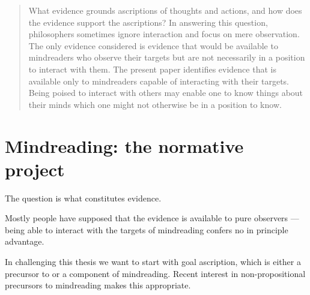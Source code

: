 \documentclass[14pt,a4paper]{extarticle}
\begin{document}
\setlength\footnotesep{1em}


\maketitle

\begin{abstract}
What evidence grounds ascriptions of thoughts and actions,
and how does the evidence support the ascriptions?
In answering this question, 
philosophers sometimes ignore interaction and focus on mere observation.
The only evidence considered is 
evidence that would be available to mindreaders who observe their targets but are not necessarily in a position to interact with them.
The present paper identifies evidence 
that is available only to mindreaders capable of interacting with their targets.
Being poised to interact with others may enable one to know things about their minds which one might not otherwise be in a position to know.



\end{abstract}


\section{Mindreading: the normative project}

The question is what constitutes evidence.

Mostly people have supposed that the evidence is available to pure observers --- being able to interact with the targets of mindreading confers no in principle advantage.

In challenging this thesis we want to start with goal ascription, which is either a precursor to or a component of mindreading.
Recent interest in non-propositional precursors to mindreading makes this appropriate.
\end{document}
